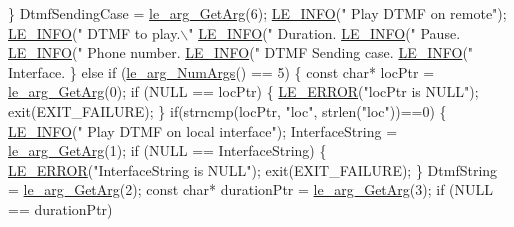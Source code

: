 \begin{DoxyCodeInclude}
{{{{{{{{{{{{        \}
        DtmfSendingCase = \hyperlink{le__args_8h_a5ebca8229facd069785639cb3c1e273a}{le\_arg\_GetArg}(6);
        \hyperlink{le__log_8h_a23e6d206faa64f612045d688cdde5808}{LE\_INFO}(\textcolor{stringliteral}{"   Play DTMF on remote"});
        \hyperlink{le__log_8h_a23e6d206faa64f612045d688cdde5808}{LE\_INFO}(\textcolor{stringliteral}{"   DTMF to play.\(\backslash\)"%
        \hyperlink{le__log_8h_a23e6d206faa64f612045d688cdde5808}{LE\_INFO}(\textcolor{stringliteral}{"   Duration.%
        \hyperlink{le__log_8h_a23e6d206faa64f612045d688cdde5808}{LE\_INFO}(\textcolor{stringliteral}{"   Pause.%
        \hyperlink{le__log_8h_a23e6d206faa64f612045d688cdde5808}{LE\_INFO}(\textcolor{stringliteral}{"   Phone number.%
        \hyperlink{le__log_8h_a23e6d206faa64f612045d688cdde5808}{LE\_INFO}(\textcolor{stringliteral}{"   DTMF Sending case.%
        \hyperlink{le__log_8h_a23e6d206faa64f612045d688cdde5808}{LE\_INFO}(\textcolor{stringliteral}{"   Interface.%
    \}
    \textcolor{keywordflow}{else} \textcolor{keywordflow}{if} (\hyperlink{le__args_8h_a6fbbeb423104e6eb92fe47ef42b7310a}{le\_arg\_NumArgs}() == 5)
    \{
        \textcolor{keyword}{const} \textcolor{keywordtype}{char}* locPtr = \hyperlink{le__args_8h_a5ebca8229facd069785639cb3c1e273a}{le\_arg\_GetArg}(0);
        \textcolor{keywordflow}{if} (NULL == locPtr)
        \{
            \hyperlink{le__log_8h_a353590f91b3143a7ba3a416ae5a50c3d}{LE\_ERROR}(\textcolor{stringliteral}{"locPtr is NULL"});
            exit(EXIT\_FAILURE);
        \}
        \textcolor{keywordflow}{if}(strncmp(locPtr, \textcolor{stringliteral}{"loc"}, strlen(\textcolor{stringliteral}{"loc"}))==0)
        \{
            \hyperlink{le__log_8h_a23e6d206faa64f612045d688cdde5808}{LE\_INFO}(\textcolor{stringliteral}{"   Play DTMF on local interface"});
            InterfaceString = \hyperlink{le__args_8h_a5ebca8229facd069785639cb3c1e273a}{le\_arg\_GetArg}(1);
            \textcolor{keywordflow}{if} (NULL == InterfaceString)
            \{
                \hyperlink{le__log_8h_a353590f91b3143a7ba3a416ae5a50c3d}{LE\_ERROR}(\textcolor{stringliteral}{"InterfaceString is NULL"});
                exit(EXIT\_FAILURE);
            \}
            DtmfString = \hyperlink{le__args_8h_a5ebca8229facd069785639cb3c1e273a}{le\_arg\_GetArg}(2);
            \textcolor{keyword}{const} \textcolor{keywordtype}{char}* durationPtr = \hyperlink{le__args_8h_a5ebca8229facd069785639cb3c1e273a}{le\_arg\_GetArg}(3);
            \textcolor{keywordflow}{if} (NULL == durationPtr)
}}}}}}}}}}}}}}}}}}
\end{DoxyCodeInclude}
